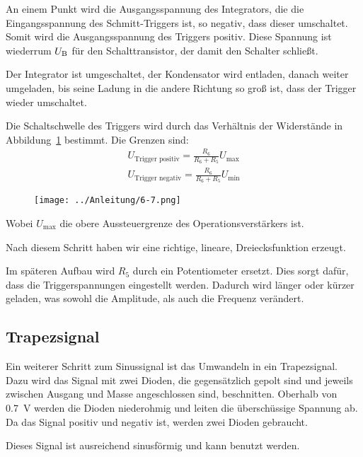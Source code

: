 An einem Punkt wird die Ausgangsspannung des
Integrators, die die Eingangsspannung des Schmitt-Triggers ist, so negativ,
dass dieser umschaltet. Somit wird die Ausgangsspannung des Triggers positiv.
Diese Spannung ist wiederrum $U_\text{B}$ für den Schalttransistor, der damit den
Schalter schließt.

Der Integrator ist umgeschaltet, der Kondensator wird entladen, danach weiter
umgeladen, bis seine Ladung in die andere Richtung so groß ist, dass der
Trigger wieder umschaltet.

Die Schaltschwelle des Triggers wird durch das Verhältnis der Widerstände in
Abbildung~\ref{fig:6-7} bestimmt. Die Grenzen sind:
\cite[(5/6.18)]{physik313-Anleitung}
\begin{gather*}
	U_\text{Trigger positiv} = \frac{R_6}{R_6 + R_5} U_\text{max} \\
	U_\text{Trigger negativ} = \frac{R_6}{R_6 + R_5} U_\text{min}
\end{gather*}

\begin{figure}[htbp]
	\centering
	\texttt{[image: ../Anleitung/6-7.png]}
	\caption{%
		\cite[Abbildung~6.7]{physik313-Anleitung}
	}
	\label{fig:6-7}
\end{figure}

Wobei $U_\text{max}$ die obere Aussteuergrenze des Operationsverstärkers ist.

Nach diesem Schritt haben wir eine richtige, lineare, Dreiecksfunktion erzeugt.

Im späteren Aufbau wird $R_5$ durch ein Potentiometer ersetzt. Dies sorgt
dafür, dass die Triggerspannungen eingestellt werden. Dadurch wird länger oder
kürzer geladen, was sowohl die Amplitude, als auch die Frequenz verändert.

\FloatBarrier
\subsection{Trapezsignal}

Ein weiterer Schritt zum Sinussignal ist das Umwandeln in ein Trapezsignal.
Dazu wird das Signal mit zwei Dioden, die gegensätzlich gepolt sind und jeweils
zwischen Ausgang und Masse angeschlossen sind, beschnitten. Oberhalb von
\SI{.7}{\volt} werden die Dioden niederohmig und leiten die überschüssige
Spannung ab. Da das Signal positiv und negativ ist, werden zwei Dioden
gebraucht.

Dieses Signal ist ausreichend sinusförmig und kann benutzt werden.

